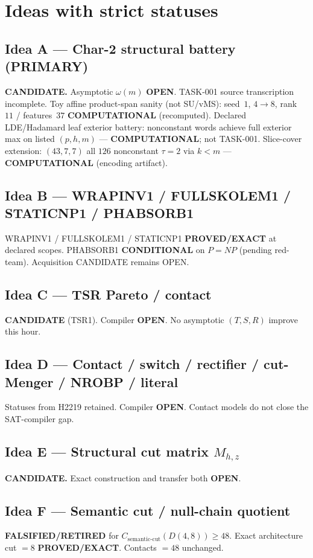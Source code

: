 \documentclass[11pt]{article}
\begin{document}
\section*{Ideas with strict statuses}
\subsection*{Idea A --- Char-2 structural battery (PRIMARY)}
\textbf{CANDIDATE.} Asymptotic $\omega(m)$ \textbf{OPEN}. TASK-001 source transcription incomplete.
Toy affine product-span sanity (not SU/vMS): seed~$1$, $4\to8$, rank~$11$ / features~$37$
\textbf{COMPUTATIONAL} (recomputed).
Declared LDE/Hadamard leaf exterior battery: nonconstant words achieve full exterior max on
listed $(p,h,m)$ --- \textbf{COMPUTATIONAL}; not TASK-001.
Slice-cover extension: $(43,7,7)$ all $126$ nonconstant $\tau{=}2$ via $k{<}m$ ---
\textbf{COMPUTATIONAL} (encoding artifact).

\subsection*{Idea B --- WRAPINV1 / FULLSKOLEM1 / STATICNP1 / PHABSORB1}
WRAPINV1 / FULLSKOLEM1 / STATICNP1 \textbf{PROVED/EXACT} at declared scopes.
PHABSORB1 \textbf{CONDITIONAL} on $P=NP$ (pending red-team). Acquisition CANDIDATE remains OPEN.

\subsection*{Idea C --- TSR Pareto / contact}
\textbf{CANDIDATE} (TSR1). Compiler \textbf{OPEN}. No asymptotic $(T,S,R)$ improve this hour.

\subsection*{Idea D --- Contact / switch / rectifier / cut-Menger / NROBP / literal}
Statuses from H2219 retained. Compiler \textbf{OPEN}. Contact models do not close the SAT-compiler gap.

\subsection*{Idea E --- Structural cut matrix $M_{h,z}$}
\textbf{CANDIDATE.} Exact construction and transfer both \textbf{OPEN}.

\subsection*{Idea F --- Semantic cut / null-chain quotient}
\textbf{FALSIFIED/RETIRED} for $C_{\mathrm{semantic\textrm{-}cut}}(D(4,8))\ge48$.
Exact architecture cut $=8$ \textbf{PROVED/EXACT}. Contacts $=48$ unchanged.
\end{document}
